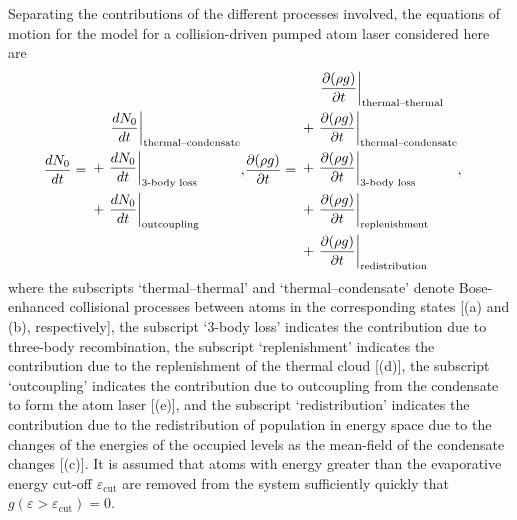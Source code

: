 Separating the contributions of the different processes involved, the equations of motion for the model for a collision-driven pumped atom laser considered here are
\begin{align}
    \frac{d N_0}{d t} =\begin{split}
        &\relphantom{+}\left. \frac{d N_0}{d t}\right|_\text{thermal--condensate} \\
        &+\left. \frac{d N_0}{d t}\right|_\text{3-body loss} \\
        &+\left. \frac{d N_0}{d t}\right|_\text{outcoupling}
    \end{split},
    & \frac{\partial (\rho g)}{\partial t} = \begin{split}
        &\relphantom{+}\left. \frac{\partial (\rho g)}{\partial t}\right|_\text{thermal--thermal} \\
        &+\left. \frac{\partial (\rho g)}{\partial t}\right|_\text{thermal--condensate} \\
        &+\left. \frac{\partial (\rho g)}{\partial t}\right|_\text{3-body loss} \\
        &+\left. \frac{\partial (\rho g)}{\partial t}\right|_\text{replenishment} \\
        &+\left. \frac{\partial (\rho g)}{\partial t}\right|_\text{redistribution}
    \end{split},
    \label{KineticTheory:EvolutionEquations}
\end{align}
where the subscripts `thermal--thermal' and `thermal--condensate' denote Bose-enhanced collisional processes between atoms in the corresponding states [(a) and (b), respectively], the subscript `3-body loss' indicates the contribution due to three-body recombination, the subscript `replenishment' indicates the contribution due to the replenishment of the thermal cloud [(d)], the subscript `outcoupling' indicates the contribution due to outcoupling from the condensate to form the atom laser [(e)], and the subscript `redistribution' indicates the contribution due to the redistribution of population in energy space due to the changes of the energies of the occupied levels as the mean-field of the condensate changes [(c)]. It is assumed that atoms with energy greater than the evaporative energy cut-off $\varepsilon_\text{cut}$ are removed from the system sufficiently quickly that  $g(\varepsilon > \varepsilon_\text{cut}) = 0$.

